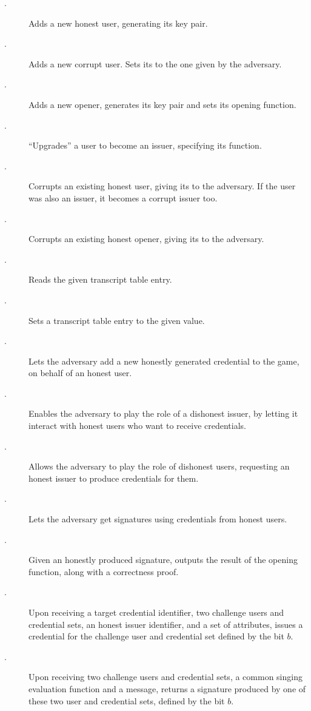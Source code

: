 \begin{description}
\item[\HUGEN.] Adds a new honest user, generating its key pair.
\item[\CUGEN.] Adds a new corrupt user. Sets its \upk to the
  one given by the adversary.  
\item[\OGEN.] Adds a new opener, generates its key pair and sets its opening
  function.
\item[\ISET.] ``Upgrades'' a user to become an issuer, specifying its
  \fissue function.
\item[\UCORR.] Corrupts an existing honest user, giving its \usk to the
  adversary. If the user was also an issuer, it becomes a corrupt issuer too.
\item[\OCORR.] Corrupts an existing honest opener, giving its \osk to the
  adversary.
\item[\RREG.] Reads the given transcript table entry.
\item[\WREG.] Sets a transcript table entry to the given value.
\item[\OBTISS.] Lets the adversary add a new honestly generated credential to
  the game, on behalf of an honest user.
\item[\OBTAIN.] Enables the adversary to play the role of a dishonest issuer, by
  letting it interact with honest users who want to receive credentials.
\item[\ISSUE.] Allows the adversary to play the role of dishonest users,
  requesting an honest issuer to produce credentials for them.
\item[\SIGN.] Lets the adversary get signatures using credentials from honest
  users.
\item[\OPEN.] Given an honestly produced signature, outputs the result of the
  opening function, along with a correctness proof.
\item[\OBTCHALb.] Upon receiving a target credential identifier, two challenge
  users and credential sets, an honest issuer identifier, and a set of
  attributes, issues a credential for the challenge user and credential set
  defined by the bit $b$. 
\item[\CHALb.] Upon receiving two challenge users and credential sets, a common
  singing evaluation function and a message, returns a signature produced by one
  of these two user and credential sets, defined by the bit $b$.
\end{description}

